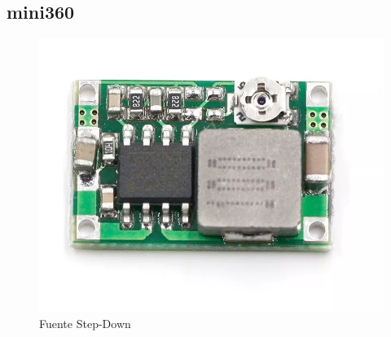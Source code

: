 \subsection{mini360}

\begin{figure}[H]
	\centering
	\includegraphics[width=0.4\textheight, angle=90]{informe_3/mini360.png}
	\caption{Fuente Step-Down}
	\label{fig:step-down}
\end{figure}